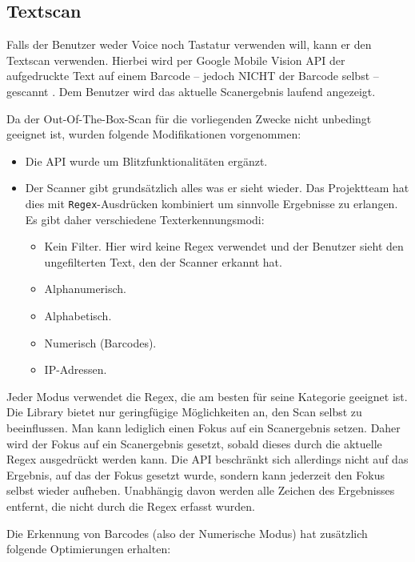 \hypertarget{textscan}{%
\subsection{Textscan}\label{textscan}}

Falls der Benutzer weder Voice noch Tastatur verwenden will, kann er den
Textscan verwenden. Hierbei wird per Google Mobile Vision API der
aufgedruckte Text auf einem Barcode -- jedoch NICHT der Barcode selbst
-- gescannt \cite{text-scan}. Dem Benutzer wird das aktuelle
Scanergebnis laufend angezeigt.

Da der Out-Of-The-Box-Scan für die vorliegenden Zwecke nicht unbedingt
geeignet ist, wurden folgende Modifikationen vorgenommen:

\begin{itemize}
\tightlist
\item
  Die API wurde um Blitzfunktionalitäten ergänzt.
\item
  Der Scanner gibt grundsätzlich alles was er sieht wieder. Das
  Projektteam hat dies mit \texttt{Regex}-Ausdrücken kombiniert um
  sinnvolle Ergebnisse zu erlangen. Es gibt daher verschiedene
  Texterkennungsmodi:

  \begin{itemize}
  \tightlist
  \item
    Kein Filter. Hier wird keine Regex verwendet und der Benutzer sieht
    den ungefilterten Text, den der Scanner erkannt hat.
  \item
    Alphanumerisch.
  \item
    Alphabetisch.
  \item
    Numerisch (Barcodes).
  \item
    IP-Adressen.
  \end{itemize}
\end{itemize}

Jeder Modus verwendet die Regex, die am besten für seine Kategorie
geeignet ist. Die Library bietet nur geringfügige Möglichkeiten an, den
Scan selbst zu beeinflussen. Man kann lediglich einen Fokus auf ein
Scanergebnis setzen. Daher wird der Fokus auf ein Scanergebnis gesetzt,
sobald dieses durch die aktuelle Regex ausgedrückt werden kann. Die API
beschränkt sich allerdings nicht auf das Ergebnis, auf das der Fokus
gesetzt wurde, sondern kann jederzeit den Fokus selbst wieder aufheben.
Unabhängig davon werden alle Zeichen des Ergebnisses entfernt, die nicht
durch die Regex erfasst wurden.

Die Erkennung von Barcodes (also der Numerische Modus) hat zusätzlich
folgende Optimierungen erhalten:

